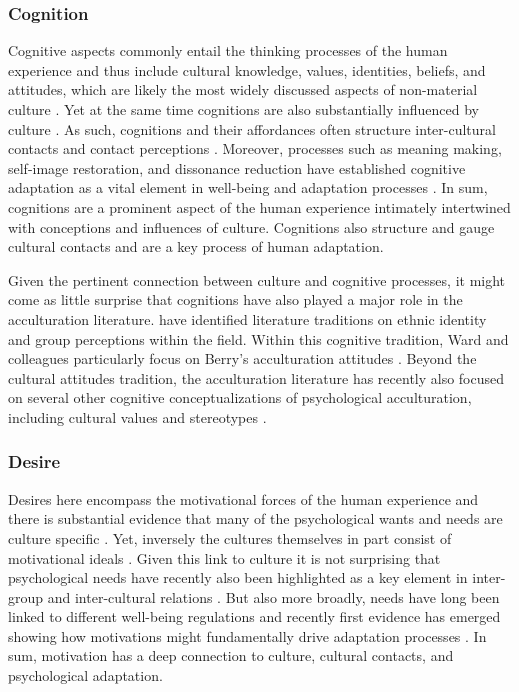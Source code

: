 \documentclass[man, 12pt, a4paper]{apa7}
\begin{document}
\subsubsection{Cognition}
Cognitive aspects commonly entail the thinking processes of the human experience and thus include cultural knowledge, values, identities, beliefs, and attitudes, which are likely the most widely discussed aspects of non-material culture \citep[e.g.,][]{DiMaggio1997}. Yet at the same time cognitions are also substantially influenced by culture \citep[e.g.,][]{Gelfand2011, Nisbett2002}. As such, cognitions and their affordances often structure inter-cultural contacts \citep[e.g., values;][]{Ramstead2016} and contact perceptions \citep[e.g., out-group attitudes;][]{Stephan2000a}. Moreover, processes such as meaning making, self-image restoration, and dissonance reduction have established cognitive adaptation as a vital element in well-being and adaptation processes \citep[e.g.,][]{Czajkowska2017}. In sum, cognitions are a prominent aspect of the human experience intimately intertwined with conceptions and influences of culture. Cognitions also structure and gauge cultural contacts and are a key process of human adaptation.

Given the pertinent connection between culture and cognitive processes, it might come as little surprise that cognitions have also played a major role in the acculturation literature. \citet{Ward2001} have identified literature traditions on ethnic identity and group perceptions within the field. Within this cognitive tradition, Ward and colleagues particularly focus on Berry's \citeyear{Berry1997b} acculturation attitudes \citep{Ward2019}. Beyond the cultural attitudes tradition, the acculturation literature has recently also focused on several other cognitive conceptualizations of psychological acculturation, including cultural values \citep[e.g.,][]{Marin2003} and stereotypes \citep[e.g.,][]{Stanciu2018}. 

\subsubsection{Desire}
Desires here encompass the motivational forces of the human experience and there is substantial evidence that many of the psychological wants and needs are culture specific \citep[e.g.,][]{McInerney2016, Morling2017}. Yet, inversely the cultures themselves in part consist of motivational ideals \citep[or oughts; e.g., see][]{Markus1991}. Given this link to culture it is not surprising that psychological needs have recently also been highlighted as a key element in inter-group and inter-cultural relations \citep{Dovidio2017, Kitayama2007, Hassler2021, Shnabel2008a}. But also more broadly, needs have long been linked to different well-being regulations \citep[e.g.,][]{Steverink2006} and recently first evidence has emerged showing how motivations might fundamentally drive adaptation processes \citep{Dignath2020}. 
In sum, motivation has a deep connection to culture, cultural contacts, and psychological adaptation.
\end{document}
